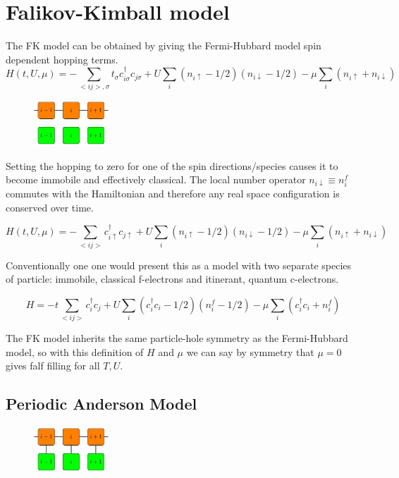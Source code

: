 \documentclass[a4paper, 11pt, onecolumn]{article}
\begin{document}
\section{Falikov-Kimball model}
The FK model  \cite{falicov_simple_1969} can be obtained by giving the Fermi-Hubbard model spin dependent hopping terms. 
$$ H(t, U, \mu) = -\sum_{<ij>,\sigma} t_{\sigma} c^\dag_{i\sigma}c_{j\sigma} + U \sum_{i} (n_{i \uparrow} - 1/2)( n_{i\downarrow} - 1/2) - \mu \sum_i \left( n_{i \uparrow} + n_{i \downarrow} \right) $$


\begin{figure}
  \begin{center}
    \includegraphics[width=0.25\textwidth]{FK_diagram}
  \end{center}
\end{figure}
Setting the hopping to zero for one of the spin directions/species causes it to become immobile and effectively classical. The local number operator \(n_{i\downarrow} \equiv n^f_i\) commutes with the Hamiltonian and therefore any real space configuration is conserved over time.

$$ H(t, U, \mu) = -\sum_{<ij>} c^\dag_{i\uparrow}c_{j\uparrow} + U \sum_{i} (n_{i \uparrow} - 1/2)( n_{i\downarrow} - 1/2) - \mu \sum_i \left( n_{i \uparrow} + n_{i \downarrow} \right) $$

Conventionally one one would present this as a model with two separate species of particle: immobile, classical f-electrons and itinerant, quantum c-electrons.

$$ H = - t\sum_{<ij>} c^\dagger_ i c_j + U \sum_i (c^\dagger_ i c_i - 1/2)(n^f_i - 1/2) - \mu \sum_i (c^\dagger_ i c_i  + n^f_i) $$

The FK model inherits the same particle-hole symmetry as the Fermi-Hubbard model, so with this definition of $H$ and $\mu$ we can say by symmetry that $\mu = 0$ gives falf filling for all $T, U$.

\subsection{Periodic Anderson Model}
\begin{figure}
  \begin{center}
    \includegraphics[width=0.25\textwidth]{PAM_diagram}
  \end{center}
\end{figure}
\end{document}
